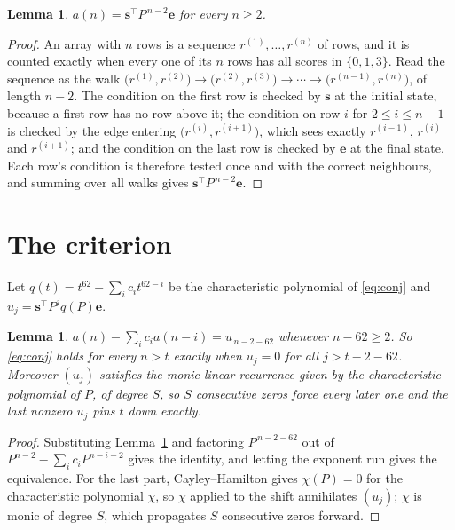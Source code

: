 \documentclass[11pt,a4paper]{article}
\theoremstyle{plain}
\newtheorem{lemma}[theorem]{Lemma}
\theoremstyle{definition}
\begin{document}
\begin{lemma}\label{lem:walk}
$a(n)=\mathbf{s}^{\!\top}P^{\,n-2}\mathbf{e}$ for every $n\ge2$.
\end{lemma}

\begin{proof}
An array with $n$ rows is a sequence $r^{(1)},\dots,r^{(n)}$ of rows, and it is counted
exactly when every one of its $n$ rows has all scores in $\{0,1,3\}$. Read the sequence as the
walk $\bigl(r^{(1)},r^{(2)}\bigr)\to\bigl(r^{(2)},r^{(3)}\bigr)\to\cdots\to
\bigl(r^{(n-1)},r^{(n)}\bigr)$, of length $n-2$. The condition on the first row is
checked by $\mathbf{s}$ at the initial state, because a first row has no row above it; the
condition on row $i$ for $2\le i\le n-1$ is checked by the edge entering
$\bigl(r^{(i)},r^{(i+1)}\bigr)$, which sees exactly $r^{(i-1)}$, $r^{(i)}$ and
$r^{(i+1)}$; and the condition on the last row is checked by $\mathbf{e}$ at the final
state. Each row's condition is therefore tested once and with the correct neighbours, and
summing over all walks gives $\mathbf{s}^{\!\top}P^{\,n-2}\mathbf{e}$.
\end{proof}

\section{The criterion}

Let $q(t)=t^{62}-\sum_i c_i t^{62-i}$ be the characteristic polynomial of
\eqref{eq:conj} and $u_j=\mathbf{s}^{\!\top}P^{j}q(P)\mathbf{e}$.

\begin{lemma}\label{lem:crit}
$a(n)-\sum_i c_i a(n-i)=u_{\,n-2-62}$ whenever $n-62\ge2$. So \eqref{eq:conj}
holds for every $n>t$ exactly when $u_j=0$ for all $j>t-2-62$. Moreover $(u_j)$
satisfies the monic linear recurrence given by the characteristic polynomial of $P$, of
degree $S$, so $S$ consecutive zeros force every later one and the last nonzero $u_j$ pins
$t$ down exactly.
\end{lemma}

\begin{proof}
Substituting Lemma~\ref{lem:walk} and factoring $P^{\,n-2-62}$ out of
$P^{n-2}-\sum_i c_i P^{n-i-2}$ gives the identity, and letting the exponent run gives the
equivalence. For the last part, Cayley--Hamilton gives $\chi(P)=0$ for the characteristic
polynomial $\chi$, so $\chi$ applied to the shift annihilates $(u_j)$; $\chi$ is monic of
degree $S$, which propagates $S$ consecutive zeros forward.
\end{proof}
\end{document}
